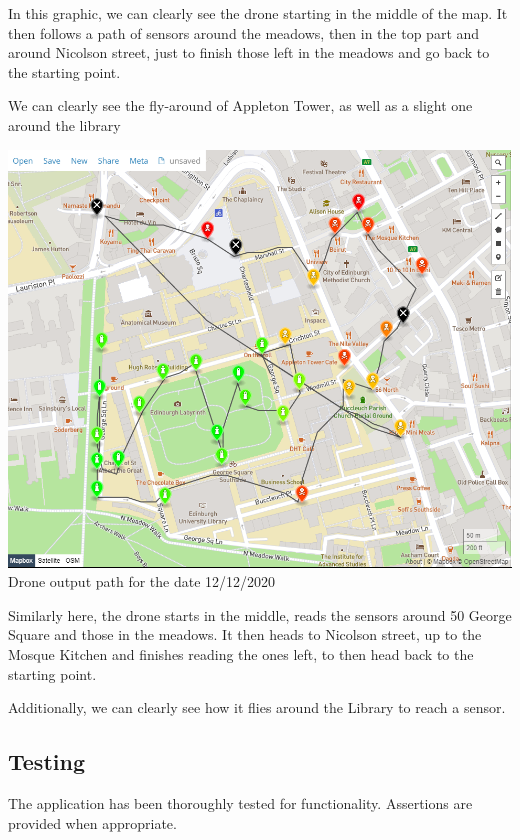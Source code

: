 \documentclass{article}
\begin{document}
In this graphic, we can clearly see the drone starting in the middle of the map. It then follows a path of sensors around the meadows, then in the top part and around Nicolson street, just to finish those left in the meadows and go back to the starting point.

We can clearly see the fly-around of Appleton Tower, as well as a slight one around the library

\begin{center}
    \includegraphics[scale=0.65]{cw2/ilp-report/res2.png}\\
    Drone output path for the date 12/12/2020
\end{center}
Similarly here, the drone starts in the middle, reads the sensors around 50 George Square and those in the meadows. It then heads to Nicolson street, up to the Mosque Kitchen and finishes reading the ones left, to then head back to the starting point.

Additionally, we can clearly see how it flies around the Library to reach a sensor.


\subsection{Testing}
The application has been thoroughly tested for functionality. Assertions are provided when appropriate.






\end{document}
